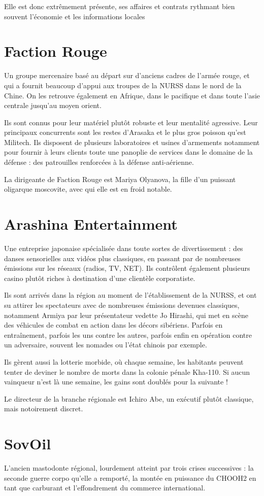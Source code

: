 \documentclass[10pt,a4paper]{book}
\begin{document}
Elle est donc extrêmement présente, ses affaires et contrats rythmant bien souvent l'économie et les informations locales
\section{Faction Rouge}
Un groupe mercenaire basé au départ sur d'anciens cadres de l'armée rouge, et qui a fournit beaucoup d'appui aux troupes de la NURSS dans le nord de la Chine. On les retrouve également en Afrique, dans le pacifique et dans toute l'asie centrale jusqu'au moyen orient.

Ils sont connus pour leur matériel plutôt robuste et leur mentalité agressive. Leur principaux concurrents sont les restes d'Arasaka et le plus gros poisson qu'est Militech. Ils disposent de plusieurs laboratoires et usines d'armements notamment pour fournir à leurs clients toute une panoplie de services dans le domaine de la défense : des patrouilles renforcées à la défense anti-aérienne.

La dirigeante de Faction Rouge est Mariya Olyanova, la fille d'un puissant oligarque moscovite, avec qui elle est en froid notable.
\section{Arashina Entertainment}
Une entreprise japonaise spécialisée dans toute sortes  de divertissement : des danses sensorielles aux vidéos plus classiques, en passant par de nombreuses émissions sur les réseaux (radios, TV, NET). Ils contrôlent également plusieurs casino plutôt riches à destination d'une clientèle corporatiste.

Ils sont arrivés dans la région au moment de l'établissement de la NURSS, et ont su attirer les spectateurs avec de nombreuses émissions devenues classiques, notamment Armiya par leur présentateur vedette Jo Hirashi, qui met en scène des véhicules de combat en action dans les décors sibériens. Parfois en entraînement, parfois les uns contre les autres, parfois enfin en opération contre un adversaire, souvent les nomades ou l'état chinois par exemple.

Ils gèrent aussi la lotterie morbide, où chaque semaine, les habitants peuvent tenter de deviner le nombre de morts dans la colonie pénale Kha-110. Si aucun vainqueur n'est là une semaine, les gains sont doublés pour la suivante !

Le directeur de la branche régionale est Ichiro Abe, un exécutif plutôt classique, mais notoirement discret.
\section{SovOil}
L'ancien mastodonte régional, lourdement atteint par trois crises successives : la seconde guerre corpo qu'elle a remporté, la montée en puissance du CHOOH2 en tant que carburant et l'effondrement du commerce international.
\end{document}
